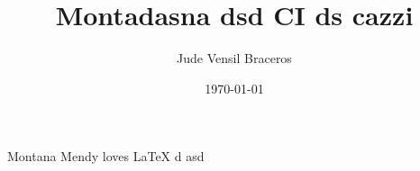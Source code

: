 \documentclass{article}
\title{Montadasna dsd  CI ds cazzi}
\author{Jude Vensil Braceros}
\date{\today}
\begin{document}
\maketitle

Montana Mendy loves LaTeX d asd
\end{document}
